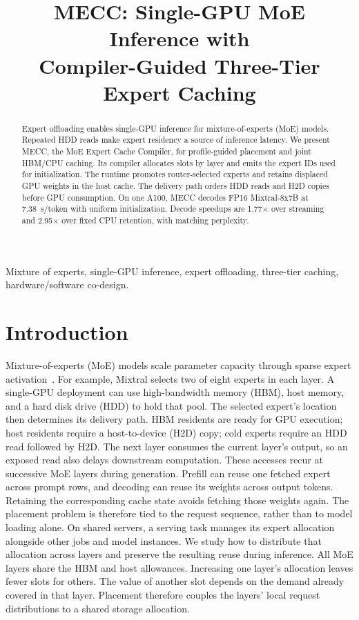 \documentclass[conference,9pt,letterpaper]{IEEEtran}
\title{MECC: Single-GPU MoE Inference with\protect\\Compiler-Guided Three-Tier Expert Caching}
\author{}
\begin{document}
\maketitle\flushbottom
\begin{abstract}
Expert offloading enables single-GPU inference for mixture-of-experts (MoE) models. Repeated HDD reads make expert residency a source of inference latency. We present MECC, the MoE Expert Cache Compiler, for profile-guided placement and joint HBM/CPU caching. Its compiler allocates slots by layer and emits the expert IDs used for initialization. The runtime promotes router-selected experts and retains displaced GPU weights in the host cache. The delivery path orders HDD reads and H2D copies before GPU consumption. On one A100, MECC decodes FP16 Mixtral-8x7B at 7.38~s/token with uniform initialization. Decode speedups are 1.77$\times$ over streaming and 2.95$\times$ over fixed CPU retention, with matching perplexity.
\end{abstract}

\begin{IEEEkeywords}
Mixture of experts, single-GPU inference, expert offloading, three-tier caching, hardware/software co-design.
\end{IEEEkeywords}

\section{Introduction}
Mixture-of-experts (MoE) models scale parameter capacity through sparse expert activation~\cite{shazeer,switch,mixtral,deepseekmoe}. For example, Mixtral selects two of eight experts in each layer. A single-GPU deployment can use high-bandwidth memory (HBM), host memory, and a hard disk drive (HDD) to hold that pool. The selected expert's location then determines its delivery path. HBM residents are ready for GPU execution; host residents require a host-to-device (H2D) copy; cold experts require an HDD read followed by H2D. The next layer consumes the current layer's output, so an exposed read also delays downstream computation. These accesses recur at successive MoE layers during generation. Prefill can reuse one fetched expert across prompt rows, and decoding can reuse its weights across output tokens. Retaining the corresponding cache state avoids fetching those weights again. The placement problem is therefore tied to the request sequence, rather than to model loading alone. On shared servers, a serving task manages its expert allocation alongside other jobs and model instances. We study how to distribute that allocation across layers and preserve the resulting reuse during inference. All MoE layers share the HBM and host allowances. Increasing one layer's allocation leaves fewer slots for others. The value of another slot depends on the demand already covered in that layer. Placement therefore couples the layers' local request distributions to a shared storage allocation.
\end{document}
